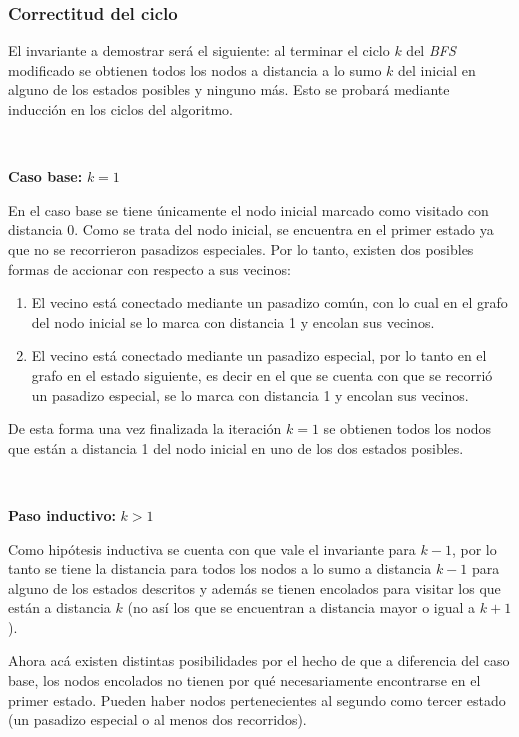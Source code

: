 	\subsubsection*{Correctitud del ciclo}

	El invariante a demostrar será el siguiente: al terminar el ciclo $k$ del
	\emph{BFS} modificado se obtienen todos los nodos a distancia a lo sumo $k$
	del inicial en alguno de los estados posibles y ninguno más. Esto se probará
	mediante inducción en los ciclos del algoritmo.

	~

	\textbf{Caso base: } $k = 1$

	En el caso base se tiene únicamente el nodo inicial marcado como
	visitado con distancia 0. Como se trata del nodo inicial, se encuentra en el primer estado ya que
	no se recorrieron pasadizos especiales. Por lo tanto, existen dos posibles
	formas de accionar con respecto a sus vecinos:

	\begin{enumerate}
		\item{
			El vecino está conectado mediante un pasadizo común, con lo cual en
			el grafo del nodo inicial se lo marca con distancia 1 y encolan sus
			vecinos.
		}
		\item{
			El vecino está conectado mediante un pasadizo especial, por lo tanto
			en el grafo en el estado siguiente, es decir en el que se cuenta con
			que se recorrió un pasadizo especial, se lo marca con distancia 1 y
			encolan sus vecinos.
		}
	\end{enumerate}

	De esta forma una vez finalizada la iteración $k = 1$ se obtienen todos los
	nodos que están a distancia 1 del nodo inicial en uno de los dos estados
	posibles.

	~

	\textbf{Paso inductivo: } $k > 1$

	Como hipótesis inductiva se cuenta con que vale el invariante para $k - 1$,
	por lo tanto se tiene la distancia para todos los nodos a lo sumo
	a distancia $k - 1$ para alguno de los estados descritos y además se
	tienen encolados para visitar los que están a distancia $k$ (no así los que
	se encuentran a distancia mayor o igual a $k + 1$).

	Ahora acá existen distintas posibilidades por el hecho de que a diferencia
	del caso base, los nodos encolados no tienen por qué necesariamente
	encontrarse en el primer estado. Pueden haber nodos pertenecientes al
	segundo como tercer estado (un pasadizo especial o al menos dos recorridos).

